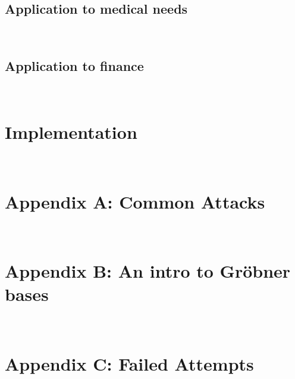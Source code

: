 \documentclass[11pt]{report}
\begin{document}
\subsection{Application to medical needs}

\

\subsection{Application to finance}

\

\section{Implementation}

\

\section{Appendix A: Common Attacks}

\

\section{Appendix B: An intro to Gr\"obner bases}

\

\section{Appendix C: Failed Attempts}
\end{document}
